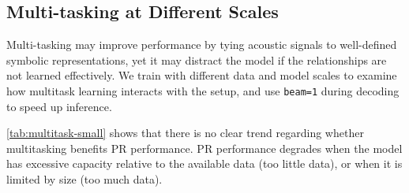 \begin{table}[h]
\centering
\small
\setlength{\tabcolsep}{4pt} %
\renewcommand{\arraystretch}{1.2}
\caption{WER ($\downarrow$) on test sets; \texttt{cmn} reports CER ($\downarrow$). \textit{POWSM-fix} is discussed in \autoref{sec:appendix-textissue}. 
\textit{Whisper} (Whisper-small) and \textit{OWSM} (OWSM v4 small) are models of similar size and architecture, trained with 10 times more data. \texttt{tam} and \texttt{kaz} are omitted due to normalization issues; Whisper outputs numerals for \texttt{cmn}, inflating its CER. }
\label{tab:asr-hrl}
\end{table}


\subsection{Multi-tasking at Different Scales}
\label{sec:appendix-multitask}
Multi-tasking may improve performance by tying acoustic signals to well-defined symbolic representations, yet it may distract the model if the relationships are not learned effectively. 
We train \POWSM with different data and model scales to examine how multitask learning interacts with the setup, and use \texttt{beam=1} during decoding to speed up inference.

\autoref{tab:multitask-small} shows that there is no clear trend regarding whether multitasking benefits PR performance. PR performance  degrades when the model has excessive capacity relative to the available data (too little data), or when it is limited by size (too much data).

